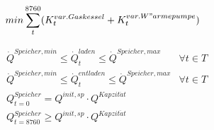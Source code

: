 \begin{equation}
	\label{eq:sum}
	min \sum_{t}^{8760} (K^{var. Gaskessel}_{t} + K^{var.W{"a}rmepumpe}_{t})
\end{equation}


\begin{align}
	&\dot{Q}^{Speicher,min} \leq \dot{Q}^{laden}_{t} \leq \dot{Q}^{Speicher,max}&\forall t \in T \label{eq:opt_grenze_beladen_speicher}\\
	&\dot{Q}^{Speicher,min} \leq \dot{Q}^{entladen}_{t} \leq \dot{Q}^{Speicher,max} &\forall t \in T \label{eq:opt_grenze_entladen_speicher}\\
	&Q^{Speicher}_{t=0} = Q^{init, sp} \cdot Q^{Kapzit \ddot{a} t}& \label{eq:opt_start_speicher}\\
	&Q^{Speicher}_{t=8760} \geq Q^{init, sp} \cdot Q^{Kapzit \ddot{a} t} & \label{eq:opt_end_speicher}
\end{align}
